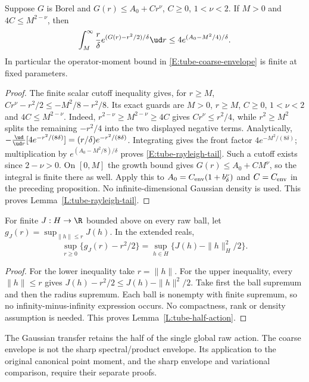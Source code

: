 \begin{lemma}\label{L:tube-rayleigh-tail}
  Suppose $G$ is Borel and $G(r)\le A_0+Cr^\nu$, $C\ge0$, $1<\nu<2$.
  If $M>0$ and $4C\le M^{2-\nu}$, then
  \begin{equation}\label{E:tube-rayleigh-tail}
    \int_M^\infty\frac r\delta
    e^{(G(r)-r^2/2)/\delta}\ud r
    \le4e^{(A_0-M^2/4)/\delta}.
  \end{equation}
  In particular the operator-moment bound in
  \eqref{E:tube-coarse-envelope} is finite at fixed parameters.
\end{lemma}

\begin{proof}
  The finite scalar cutoff inequality gives, for $r\ge M$,
  $Cr^\nu-r^2/2\le-M^2/8-r^2/8$.
  Its exact guards are $M>0$, $r\ge M$, $C\ge0$,
  $1<\nu<2$ and $4C\le M^{2-\nu}$.
  Indeed, $r^{2-\nu}\ge M^{2-\nu}\ge4C$ gives
  $Cr^\nu\le r^2/4$, while $r^2\ge M^2$ splits the
  remaining $-r^2/4$ into the two displayed negative terms.
  Analytically,
  $-\frac{\ud}{\ud r}[4e^{-r^2/(8\delta)}]
  =(r/\delta)e^{-r^2/(8\delta)}$.
  Integrating gives the front factor $4e^{-M^2/(8\delta)}$;
  multiplication by $e^{(A_0-M^2/8)/\delta}$ proves
  \eqref{E:tube-rayleigh-tail}.
  Such a cutoff exists since $2-\nu>0$.
  On $[0,M]$ the growth bound gives $G(r)\le A_0+CM^\nu$,
  so the integral is finite there as well.
  Apply this to $A_0=C_{\rm env}(1+b_\delta^\nu)$ and
  $C=C_{\rm env}$ in the preceding proposition.
  No infinite-dimensional Gaussian density is used.
  This proves Lemma~\ref{L:tube-rayleigh-tail}.
\end{proof}

\begin{lemma}\label{L:tube-half-action}
  For finite $J:H\to\R$ bounded above on every raw ball,
  let $g_J(r)=\sup_{\|h\|\le r}J(h)$. In the extended reals,
  \[
    \sup_{r\ge0}\{g_J(r)-r^2/2\}
    =\sup_{h\in H}\{J(h)-\|h\|_H^2/2\}.
  \]
\end{lemma}

\begin{proof}
  For the lower inequality take $r=\|h\|$.
  For the upper inequality, every $\|h\|\le r$ gives
  $J(h)-r^2/2\le J(h)-\|h\|^2/2$.
  Take first the ball supremum and then the radius supremum.
  Each ball is nonempty with finite supremum, so no
  infinity-minus-infinity expression occurs.
  No compactness, rank or density assumption is needed.
  This proves Lemma~\ref{L:tube-half-action}.
\end{proof}

The Gaussian transfer retains the half of the single global raw action.
The coarse envelope is not the sharp spectral/product envelope.
Its application to the original canonical point moment, and the sharp
envelope and variational comparison, require their separate proofs.
